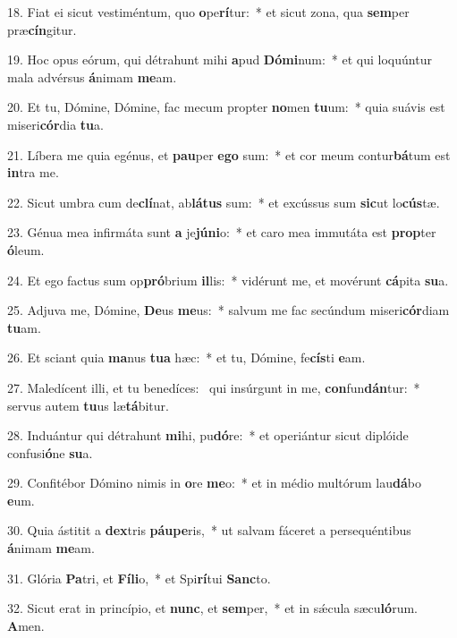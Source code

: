 18. Fiat ei sicut vestiméntum, quo \textbf{o}pe\textbf{rí}tur:~*  et sicut zona, qua \textbf{sem}per præ\textbf{cín}gitur.\

19. Hoc opus eórum, qui détrahunt mihi \textbf{a}pud \textbf{Dó}\textbf{mi}num:~*  et qui loquúntur mala advérsus \textbf{á}nimam \textbf{me}am.\

20. Et tu, Dómine, Dómine, fac mecum propter \textbf{no}men \textbf{tu}um:~*  quia suávis est miseri\textbf{cór}dia \textbf{tu}a.\

21. Líbera me quia egénus, et \textbf{pau}per \textbf{e}\textbf{go} sum:~*  et cor meum contur\textbf{bá}tum est \textbf{in}tra me.\

22. Sicut umbra cum de\textbf{clí}nat, ab\textbf{lá}\textbf{tus} sum:~*  et excússus sum \textbf{sic}ut lo\textbf{cús}tæ.\

23. Génua mea infirmáta sunt \textbf{a} je\textbf{jú}\textbf{ni}o:~*  et caro mea immutáta est \textbf{prop}ter \textbf{ó}leum.\

24. Et ego factus sum op\textbf{pró}brium \textbf{il}lis:~*  vidérunt me, et movérunt \textbf{cá}pita \textbf{su}a.\

25. Adjuva me, Dómine, \textbf{De}us \textbf{me}us:~*  salvum me fac secúndum miseri\textbf{cór}diam \textbf{tu}am.\

26. Et sciant quia \textbf{ma}nus \textbf{tu}\textbf{a} hæc:~*  et tu, Dómine, fe\textbf{cís}ti \textbf{e}am.\

27. Maledícent illi, et tu benedíces: \dag\  qui insúrgunt in me, \textbf{con}fun\textbf{dán}tur:~*  servus autem \textbf{tu}us læ\textbf{tá}bitur.\

28. Induántur qui détrahunt \textbf{mi}hi, pu\textbf{dó}re:~*  et operiántur sicut diplóide confusi\textbf{ó}ne \textbf{su}a.\

29. Confitébor Dómino nimis in \textbf{o}re \textbf{me}o:~*  et in médio multórum lau\textbf{dá}bo \textbf{e}um.\

30. Quia ástitit a \textbf{dex}tris \textbf{páu}\textbf{pe}ris,~*  ut salvam fáceret a persequéntibus \textbf{á}nimam \textbf{me}am.\

31. Glória \textbf{Pa}tri, et \textbf{Fí}\textbf{li}o,~*  et Spi\textbf{rí}tui \textbf{Sanc}to.\

32. Sicut erat in princípio, et \textbf{nunc}, et \textbf{sem}per,~*  et in sǽcula sæcu\textbf{ló}rum. \textbf{A}men.\

